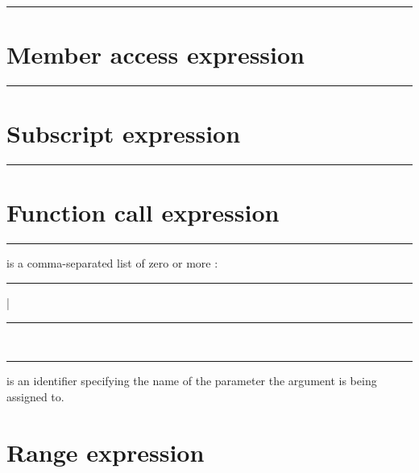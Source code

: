 \begin{grammar}
\rule{conditional-expression}    \code{:} 
\end{grammar}

\section{Member access expression}

\begin{grammar}
\rule{member-access-expression}   
\end{grammar}

\section{Subscript expression}

\begin{grammar}
\rule{subscript-expression}  \code{[}  \code{]}
\end{grammar}

\section{Function call expression}

\begin{grammar}
\rule{call-expression}  \code{(}  \code{)}
\end{grammar}

 is a comma-separated list of zero or more
:

\begin{grammar}
\rule{argument-specifier}  | \\
\rule{unnamed-argument} \\
\rule{named-argument}  \code{:} 
\end{grammar}

 is an identifier specifying the name of the
parameter the argument  is being assigned to.

\section{Range expression}

